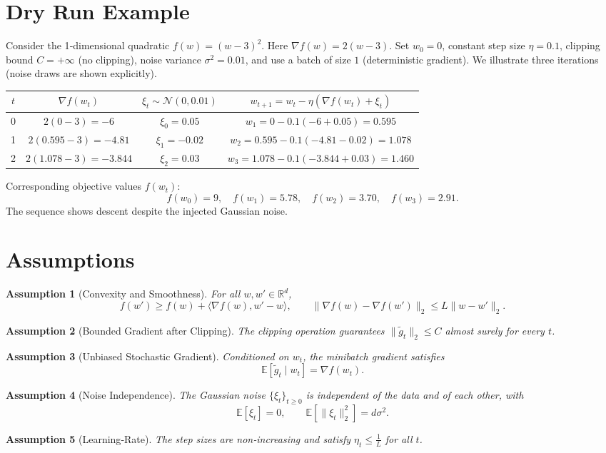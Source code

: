 \documentclass{article}
\newtheorem{assumption}{Assumption}
\newcommand{\E}{\mathbb{E}}
\newcommand{\R}{\mathbb{R}}
\begin{document}
\section*{Dry Run Example}
Consider the 1‑dimensional quadratic $f(w)=(w-3)^2$.  
Here $\nabla f(w)=2(w-3)$.  Set $w_0=0$, constant step size $\eta=0.1$, clipping bound $C=+\infty$ (no clipping), noise variance $\sigma^2=0.01$, and use a batch of size $1$ (deterministic gradient).  
We illustrate three iterations (noise draws are shown explicitly).

\begin{center}
\begin{tabular}{c|c|c|c}
$t$ & $\nabla f(w_t)$ & $\xi_t\sim\mathcal{N}(0,0.01)$ & $w_{t+1}=w_t-\eta(\nabla f(w_t)+\xi_t)$ \\ \hline
0 & $2(0-3)=-6$ & $\xi_0=0.05$ & $w_1=0-0.1(-6+0.05)=0.595$ \\ 
1 & $2(0.595-3)=-4.81$ & $\xi_1=-0.02$ & $w_2=0.595-0.1(-4.81-0.02)=1.078$ \\ 
2 & $2(1.078-3)=-3.844$ & $\xi_2=0.03$ & $w_3=1.078-0.1(-3.844+0.03)=1.460$ 
\end{tabular}
\end{center}
Corresponding objective values $f(w_t)$:
\[
f(w_0)=9,\quad f(w_1)=5.78,\quad f(w_2)=3.70,\quad f(w_3)=2.91.
\]
The sequence shows descent despite the injected Gaussian noise.

\section*{Assumptions}
\begin{assumption}[Convexity and Smoothness]\label{ass:convex}
For all $w,w'\in\R^{d}$,
\[
f(w')\ge f(w)+\langle\nabla f(w),w'-w\rangle,
\qquad 
\|\nabla f(w)-\nabla f(w')\|_2\le L\|w-w'\|_2 .
\]
\end{assumption}
\begin{assumption}[Bounded Gradient after Clipping]\label{ass:bound}
The clipping operation guarantees $\|\tilde g_t\|_2\le C$ almost surely for every $t$.
\end{assumption}
\begin{assumption}[Unbiased Stochastic Gradient]\label{ass:unbiased}
Conditioned on $w_t$, the minibatch gradient satisfies
\[
\E[\tilde g_t\mid w_t]=\nabla f(w_t).
\]
\end{assumption}
\begin{assumption}[Noise Independence]\label{ass:noise}
The Gaussian noise $\{\xi_t\}_{t\ge0}$ is independent of the data and of each other, with
\[
\E[\xi_t]=0,\qquad \E[\|\xi_t\|_2^{2}]=d\sigma^{2}.
\]
\end{assumption}
\begin{assumption}[Learning‑Rate]\label{ass:lr}
The step sizes are non‑increasing and satisfy $\eta_t\le \frac{1}{L}$ for all $t$.
\end{assumption}
\end{document}
